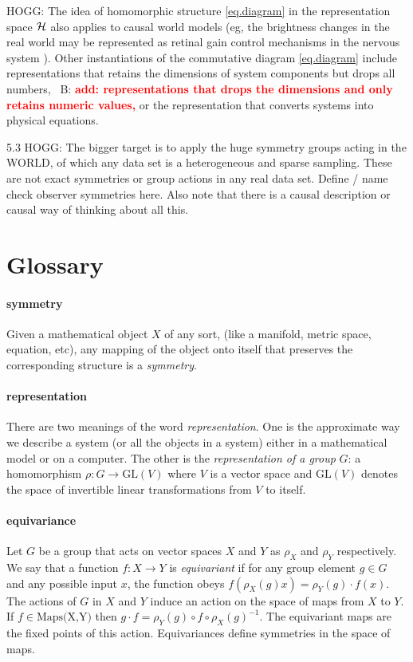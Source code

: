\documentclass{article}
\theoremstyle{plain}
\theoremstyle{definition}
\theoremstyle{remark}
\newcommand{\bernhard}[1]{~B: \textcolor{red}{\textbf{#1}}}
\begin{document}
HOGG: The idea of homomorphic structure \eqref{eq.diagram} in the representation space $\cal H$ also applies to causal world models (eg, the brightness changes in the real world may be represented as retinal gain control mechanisms in the nervous system \cite{1911.10500}).
 Other instantiations of the commutative diagram \eqref{eq.diagram} include representations that retains the dimensions of system components but drops all numbers, \bernhard{add: representations that drops the dimensions and only retains numeric values,} or the representation that converts systems into physical equations.
   
   5.3 HOGG: The bigger target is to apply the huge symmetry groups acting in the WORLD, of which any data set is a heterogeneous and sparse sampling. These are not exact symmetries or group actions in any real data set. Define / name check observer symmetries here. Also note that there is a causal description or causal way of thinking about all this.

{\raggedright


}

\newpage\appendix\onecolumn
\section{Glossary}
\paragraph{symmetry}
Given a mathematical object $X$ of any sort, (like a manifold, metric space, equation, etc), any mapping of the object onto itself that preserves the corresponding structure is a \emph{symmetry}.

\paragraph{representation}
There are two meanings of the word \emph{representation}. One is the approximate way we describe a system (or all the objects in a system) either in a mathematical model or on a computer.
The other is the \emph{representation of a group} $G$: a homomorphism $\rho: G\to \text{GL}(V)$ where $V$ is a vector space and $\text{GL}(V)$ denotes the space of invertible linear transformations from $V$ to itself.

\paragraph{equivariance}
Let $G$ be a group that acts on vector spaces $X$ and $Y$ as $\rho_X$ and $\rho_Y$ respectively. We say that a function $f:X\to Y$ is \emph{equivariant} if for any group element $g\in G$ and any possible input $x$, the function obeys $f( \rho_X(g) x) = \rho_Y(g)\cdot f(x)$.
The actions of $G$ in $X$ and $Y$ induce an action on the space of maps from $X$ to $Y$. If $f\in \text{Maps(X,Y)}$ then $g\cdot f = \rho_Y(g)\circ f \circ \rho_X(g)^{-1}$.
The equivariant maps are the fixed points of this action.
Equivariances define symmetries in the space of maps. 
\end{document}
